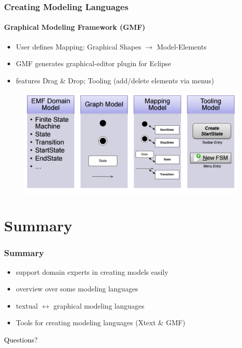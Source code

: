 \documentclass[11 pt,t]{beamer}
\begin{document}
\begin{frame}
\vspace{.5cm}
  \frametitle{Creating Modeling Languages}
  \framesubtitle{Graphical Modeling Framework (GMF)}
  \begin{itemize}
    \item User defines Mapping: Graphical Shapes $\rightarrow$ Model-Elements
    \item GMF generates graphical-editor plugin for Eclipse 
    \item features Drag \& Drop; Tooling (add/delete elements via menus)
  \end{itemize}
  \begin{figure}[htbp]
      \centering
      \includegraphics[width=\textwidth]{images/TableGMFSteps.PNG}
      \label{mapmodel}
    \end{figure}
\end{frame}

\section{Summary}
\begin{frame}
  \vspace{2cm}
  \frametitle{Summary}
  \begin{itemize}
    \item support domain experts in creating models easily 
    \item overview over some modeling languages
    \item textual $\leftrightarrow$ graphical modeling languages
    \item Tools for creating modeling languages (Xtext \& GMF)
  \end{itemize}
\end{frame}

\appendix
\begin{frame}
\vspace{4cm}
\centering \Large \textcolor{black}{Questions?}

\end{frame}
\end{document}
